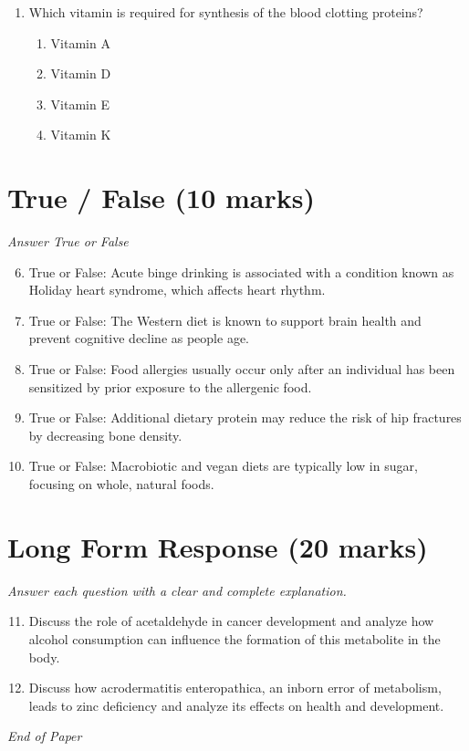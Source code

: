 \documentclass[12pt]{article}
\begin{document}
\begin{enumerate}[label=\arabic*.]
\begin{enumerate}[label=(\alph*)]
    \item Glycolysis requires NADP+
    \item In glycolysis, glucose is cleaved into two three-carbon products
    \item The end-product of glycolysis in red blood cells is pyruvate
\end{enumerate}
\item Which vitamin is required for synthesis of the blood clotting proteins?
\begin{enumerate}[label=(\alph*)]
    \item Vitamin A
    \item Vitamin D
    \item Vitamin E
    \item Vitamin K
\end{enumerate}
\end{enumerate}

\section*{True / False (10 marks)}
\textit{Answer True or False}
\begin{enumerate}[label=\arabic*.]
\setcounter{enumi}{5}
\item True or False: Acute binge drinking is associated with a condition known as Holiday heart syndrome, which affects heart rhythm.
\item True or False: The Western diet is known to support brain health and prevent cognitive decline as people age.
\item True or False: Food allergies usually occur only after an individual has been sensitized by prior exposure to the allergenic food.
\item True or False: Additional dietary protein may reduce the risk of hip fractures by decreasing bone density.
\item True or False: Macrobiotic and vegan diets are typically low in sugar, focusing on whole, natural foods.
\end{enumerate}

\section*{Long Form Response (20 marks)}
\textit{Answer each question with a clear and complete explanation.}
\begin{enumerate}[label=\arabic*.]
\setcounter{enumi}{10}
\item Discuss the role of acetaldehyde in cancer development and analyze how alcohol consumption
can influence the formation of this metabolite in the body.
\item Discuss how acrodermatitis enteropathica, an inborn error of metabolism, leads to zinc
deficiency and analyze its effects on health and development.
\end{enumerate}

\vfill
\noindent\textit{End of Paper}
\end{document}
